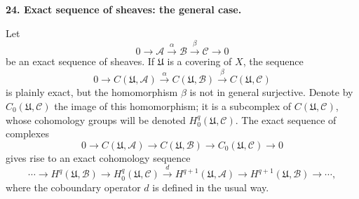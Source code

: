 
\medskip
{}\label{fac:I:3:no:24}
\textbf{24. Exact sequence of sheaves: the general case.}

Let
\[
0\longrightarrow\mathcal{A}\xrightarrow{\alpha}\mathcal{B}
\xrightarrow{\beta}\mathcal{C}\longrightarrow0
\]
be an exact sequence of sheaves. If $\mathfrak{U}$ is a covering of $X$, the sequence
\[
0\longrightarrow C(\mathfrak{U},\mathcal{A})
\xrightarrow{\alpha}C(\mathfrak{U},\mathcal{B})
\xrightarrow{\beta}C(\mathfrak{U},\mathcal{C})
\]
is plainly exact, but the homomorphism $\beta$ is not in general surjective. Denote by $C_0(\mathfrak{U},\mathcal{C})$ the image of this homomorphism; it is a subcomplex of $C(\mathfrak{U},\mathcal{C})$, whose cohomology groups will be denoted $H_0^q(\mathfrak{U},\mathcal{C})$. The exact sequence of complexes
\[
0\longrightarrow C(\mathfrak{U},\mathcal{A})
\longrightarrow C(\mathfrak{U},\mathcal{B})
\longrightarrow C_0(\mathfrak{U},\mathcal{C})\longrightarrow0
\]
gives rise to an exact cohomology sequence
\[
\cdots\longrightarrow H^q(\mathfrak{U},\mathcal{B})
\longrightarrow H_0^q(\mathfrak{U},\mathcal{C})
\xrightarrow{d}H^{q+1}(\mathfrak{U},\mathcal{A})
\longrightarrow H^{q+1}(\mathfrak{U},\mathcal{B})\longrightarrow\cdots,
\]
where the coboundary operator $d$ is defined in the usual way.

